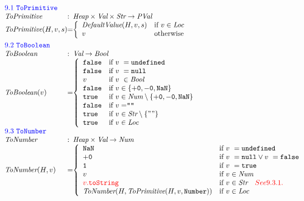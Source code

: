 \[
\begin{array}{l@{}l@{}ll}
\multicolumn{3}{l}{\mbox{\inblue 9.1 {\tt ToPrimitive}}}\\
\hf{ToPrimitive} & :& \Heap \times \Val \times \Str \rightarrow \pval \\
\hf{ToPrimitive}(H,v,s) &=&
\left\{ \begin{array}{ll}
\hf{DefaultValue}(H,v,s) &\mbox{if $v\in\Loc$}\\
v&\mbox{otherwise}\\
\end{array}
\right.
\\[1em]

\multicolumn{3}{l}{\mbox{\inblue 9.2 {\tt ToBoolean}}}\\
\hf{ToBoolean} & :& \Val \rightarrow \Bool \\
\hf{ToBoolean}(v) &=&
\left\{ \begin{array}{ll}
\false &\mbox{if $v\ = \undef$}\\
\false &\mbox{if $v\ = \nullK$}\\
v &\mbox{if $v\ \in \Bool$}\\
\false &\mbox{if $v\in\{{\tt +0}, {\tt -0}, {\tt NaN}\}$}\\
\true &\mbox{if $v\in\Num\setminus\{{\tt +0}, {\tt -0}, {\tt NaN}\}$}\\
\false &\mbox{if $v = ${\tt ""}}\\
\true &\mbox{if $v\in\Str\setminus\{{\tt ""}\}$}\\
\true &\mbox{if $v\in\Loc$}\\
\end{array}
\right.
\\[1em]

\multicolumn{3}{l}{\mbox{\inblue 9.3 {\tt ToNumber}}}\\
\hf{ToNumber} & :& \Heap \times \Val \rightarrow \Num \\
\hf{ToNumber}(H,v) &=&
\left\{ \begin{array}{ll}
{\tt NaN} &\mbox{if $v\ = \undef$}\\
{\tt +0} &\mbox{if $v\ = \nullK \vee v\ = \false$}\\
{\tt 1} &\mbox{if $v\ = \true$}\\
v &\mbox{if $v\in\Num$}\\
{\inred v.{\tt toString}} &\mbox{if $v\in\Str\quad{\inred See 9.3.1.}$}\\
\hf{ToNumber}(H,\hf{ToPrimitive}(H,v,\verb+Number+)) &\mbox{if $v\in\Loc$}\\
\end{array}
\right.
\\[1em]



\end{array}\]
